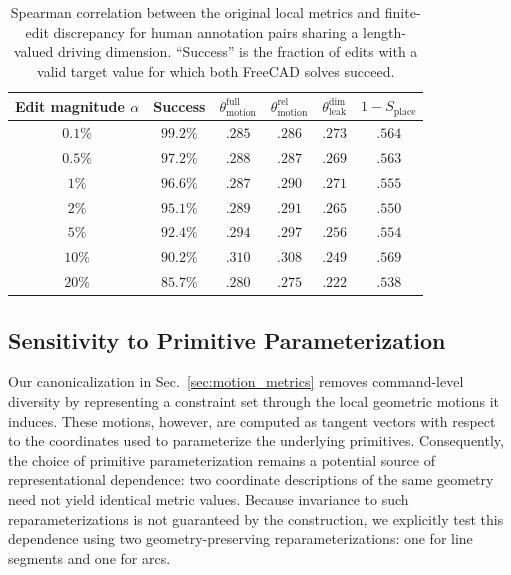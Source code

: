 \begin{table}[t]
    \centering
    \footnotesize
    \setlength{\tabcolsep}{3pt}
    \caption{Spearman correlation between the original local metrics and finite-edit discrepancy for human annotation pairs sharing a length-valued driving dimension. ``Success'' is the fraction of edits with a valid target value for which both FreeCAD solves succeed.}
    \label{tab:appendix_finite_edit}
    \begin{tabular}{@{}c c c c c c@{}}
        \toprule
        Edit magnitude $\alpha$
        & Success
        & $\theta_\mathrm{motion}^\mathrm{full}$
        & $\theta_\mathrm{motion}^\mathrm{rel}$
        & $\theta_\mathrm{leak}^\mathrm{dim}$
        & $1-S_\mathrm{place}$ \\
        \midrule
        $0.1\%$ & $99.2\%$ & $.285$ & $.286$ & $.273$ & $.564$ \\
        $0.5\%$ & $97.2\%$ & $.288$ & $.287$ & $.269$ & $.563$ \\
        $1\%$ & $96.6\%$ & $.287$ & $.290$ & $.271$ & $.555$ \\
        $2\%$ & $95.1\%$ & $.289$ & $.291$ & $.265$ & $.550$ \\
        $5\%$ & $92.4\%$ & $.294$ & $.297$ & $.256$ & $.554$ \\
        $10\%$ & $90.2\%$ & $.310$ & $.308$ & $.249$ & $.569$ \\
        $20\%$ & $85.7\%$ & $.280$ & $.275$ & $.222$ & $.538$ \\
        \bottomrule
    \end{tabular}
\end{table}


\subsection{Sensitivity to Primitive Parameterization}
\label{sec:appendix_parameterization_sensitivity}
Our canonicalization in Sec.~\ref{sec:motion_metrics} removes command-level diversity by representing a constraint set through the local geometric motions it induces. These motions, however, are computed as tangent vectors with respect to the coordinates used to parameterize the underlying primitives. Consequently, the choice of primitive parameterization remains a potential source of representational dependence: two coordinate descriptions of the same geometry need not yield identical metric values. Because invariance to such reparameterizations is not guaranteed by the construction, we explicitly test this dependence using two geometry-preserving reparameterizations: one for line segments and one for arcs.

